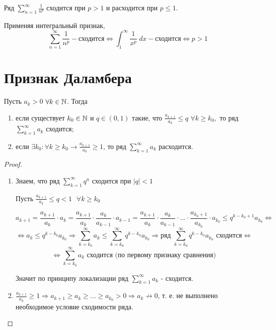 	\begin{example}
		Ряд $\displaystyle \sum_{n = 1}^{\infty} \frac{1}{n^p}$ сходится при $p > 1$ и расходится при $p \leqslant 1$.
	\end{example}
	
	Применяя интегральный признак,
	\[ \sum_{n = 1}^{\infty} \frac{1}{n^p} - \text{сходится} \Leftrightarrow \int_1^{\infty} \frac{1}{x^p} \; dx - \text{сходится} \Leftrightarrow p > 1 \]
	
	\section{Признак Даламбера}
	
	\begin{theorem}
		Пусть $a_k > 0$ $\forall k \in \mathbb N$. Тогда
		\begin{enumerate}
			\item если существует $k_0 \in \mathbb N$ и $q \in (0, 1)$ такие, что $\frac{a_{k + 1}}{a_k} \leqslant q$ $\forall k \geqslant k_0,$ то ряд $\displaystyle \sum_{k = 1}^{\infty} a_k$ сходится;
			\item если $\exists k_0 : \forall k \geqslant k_0 \rightarrow \frac{a_{k + 1}}{a_k} \geqslant 1$, то ряд $\displaystyle \sum_{k = 1}^{\infty} a_k$ расходится.
		\end{enumerate}
	\end{theorem}
	
	\begin{proof}
		\begin{enumerate}
			\item Знаем, что ряд $\sum_{k = 1}^{\infty} q^n$ сходится при $|q| < 1$
			
			Пусть $\frac{a_{k + 1}}{a_k} \leqslant q < 1 \text{ } \forall k \geqslant k_0$
			
			\[ a_{k + 1} = \frac{a_{k + 1}}{a_k} \cdot a_k = \frac{a_{k + 1}}{a_k} \cdot \frac{a_k}{a_{k - 1}} \cdot a_{k - 1} = \frac{a_{k + 1}}{a_k} \cdot \frac{a_k}{a_{k - 1}} \cdot ... \cdot \frac{a_{k_0 + 1}}{a_{k_0}} \cdot a_{k_0} \leqslant q^{k - k_0 + 1} a_{k_0} \Leftrightarrow \]
			\[ \Leftrightarrow a_k \leqslant q^{k - k_0} a_{k_0} \Rightarrow \sum_{k = k_0}^{\infty} a_k \leqslant \sum_{k = k_0}^{\infty} q^{k - k_0} a_{k_0} \Rightarrow \text{ряд } \sum_{k = k_0}^{\infty} q^{k - k_0} a_{k_0} \text{ сходится} \Leftrightarrow \]
			\[ \Leftrightarrow \sum_{k = k_0}^{\infty} a_k \text{ сходится (по первому признаку сравнения)} \]
			
			Значит по принципу локализации ряд $\sum_{k = 1}^{\infty} a_k$ - сходится.
			
			\item $\frac{a_{k + 1}}{a_k} \geqslant 1 \Rightarrow a_{k + 1} \geqslant a_k \geqslant ... \geqslant a_{k_0} > 0 \Rightarrow a_k \not\rightarrow 0$, т. е. не выполнено необходимое условие сходимости ряда.
			
		\end{enumerate}
	\end{proof}
	
